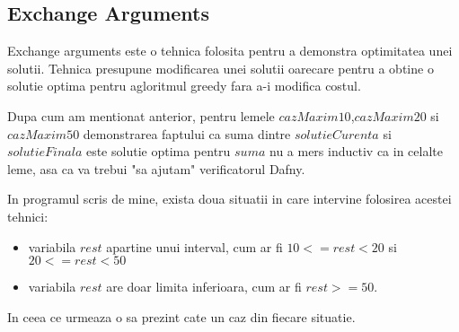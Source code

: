 \subsection{Exchange Arguments}
Exchange arguments este o tehnica folosita pentru a demonstra optimitatea unei solutii. Tehnica presupune modificarea unei solutii oarecare pentru a obtine o solutie optima pentru agloritmul greedy fara a-i modifica costul.\par 
Dupa cum am mentionat anterior, pentru lemele $cazMaxim10$,$cazMaxim20$ si $cazMaxim50$ demonstrarea faptului ca suma dintre $solutieCurenta$ si $solutieFinala$ este solutie optima pentru $suma$ nu a mers inductiv ca in celalte leme, asa ca va trebui "sa ajutam" verificatorul Dafny.\par 
In programul scris de mine, exista doua situatii in care intervine folosirea acestei tehnici: 
\begin{itemize}
	\item variabila $rest$ apartine unui interval, cum ar fi $10 <= rest <20 $ si $20 <= rest < 50$
	\item variabila $rest$ are doar limita inferioara, cum ar fi $rest >= 50$.
\end{itemize}
\par 
In ceea ce urmeaza o sa prezint cate un caz din fiecare situatie. 
\par
\vspace{2cm}
